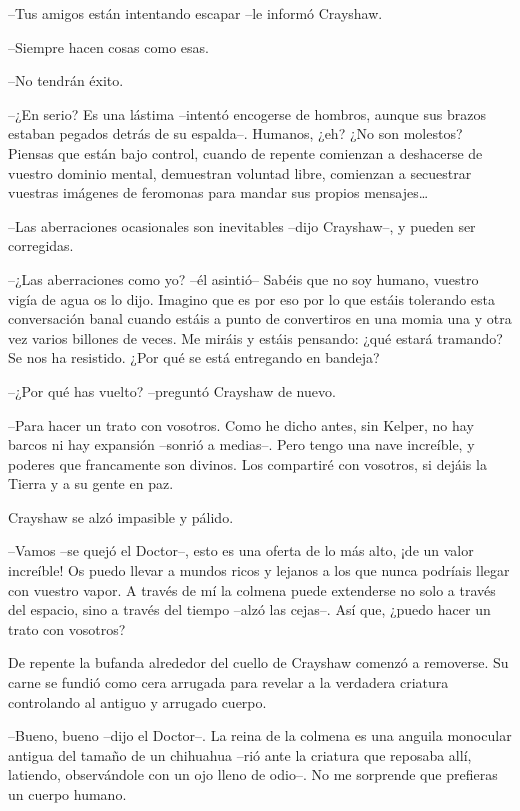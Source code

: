 {--Tus amigos están intentando escapar --le informó Crayshaw.}

{--Siempre hacen cosas como esas.}

{--No tendrán éxito.}

{--¿En serio? Es una lástima --intentó encogerse de hombros, aunque sus
 brazos estaban pegados detrás de su espalda--. Humanos, ¿eh? ¿No son
 molestos? Piensas que están bajo control, cuando de repente comienzan a
 deshacerse de vuestro dominio mental, demuestran voluntad libre,
 comienzan a secuestrar vuestras imágenes de feromonas para mandar sus
 propios mensajes\ldots{}}

{--Las aberraciones ocasionales son inevitables --dijo Crayshaw--, y
pueden ser corregidas.}

{--¿Las aberraciones como yo? --él asintió-- Sabéis que no soy humano,
 vuestro vigía de agua os lo dijo. Imagino que es por eso por lo que
 estáis tolerando esta conversación banal cuando estáis a punto de
 convertiros en una momia una y otra vez varios billones de veces. Me
 miráis y estáis pensando: ¿qué estará tramando? Se nos ha resistido.
¿Por qué se está entregando en bandeja?}

{--¿Por qué has vuelto? --preguntó Crayshaw de nuevo.}

{--Para hacer un trato con vosotros. Como he dicho antes, sin Kelper, no
 hay barcos ni hay expansión --sonrió a medias--. Pero tengo una nave
 increíble, y poderes que francamente son divinos. Los compartiré con
vosotros, si dejáis la Tierra y a su gente en paz.}

{Crayshaw se alzó impasible y pálido.}

{--Vamos --se quejó el Doctor--, esto es una oferta de lo más alto, ¡de
 un valor increíble! Os puedo llevar a mundos ricos y lejanos a los que
 nunca podríais llegar con vuestro vapor. A través de mí la colmena puede
 extenderse no solo a través del espacio, sino a través del tiempo --alzó
las cejas--. Así que, ¿puedo hacer un trato con vosotros?}

{De repente la bufanda alrededor del cuello de Crayshaw comenzó a
 removerse. Su carne se fundió como cera arrugada para revelar a la
verdadera criatura controlando al antiguo y arrugado cuerpo.}

{--Bueno, bueno --dijo el Doctor--. La reina de la colmena es una
 anguila monocular antigua del tamaño de un chihuahua --rió ante la
 criatura que reposaba allí, latiendo, observándole con un ojo lleno de
odio--. No me sorprende que prefieras un cuerpo humano.}

